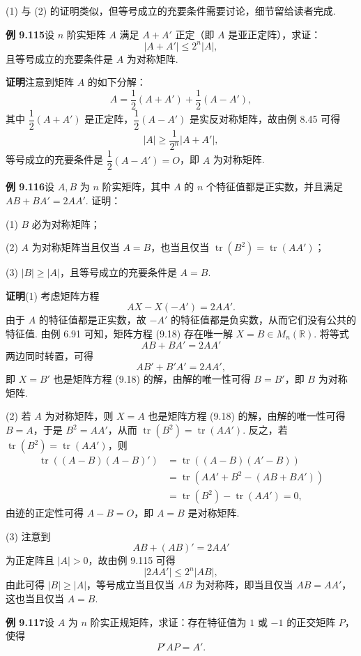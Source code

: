 \documentclass[UTF8,12pt,a4paper,fontset=fandol]{ctexart}
\begin{document}
(1) 与 (2) 的证明类似，但等号成立的充要条件需要讨论，细节留给读者完成.

\noindent\textbf{例 9.115}\quad 设 $n$ 阶实矩阵 $A$ 满足 $A+A'$ 正定（即 $A$ 是亚正定阵），求证：
\[
|A+A'|\le2^n|A|,
\]
且等号成立的充要条件是 $A$ 为对称矩阵.

\noindent\textbf{证明}\quad 注意到矩阵 $A$ 的如下分解：
\[
A=\frac{1}{2}(A+A')+\frac{1}{2}(A-A'),
\]
其中 $\dfrac{1}{2}(A+A')$ 是正定阵，$\dfrac{1}{2}(A-A')$ 是实反对称矩阵，故由例 8.45 可得
\[
|A|\ge \frac{1}{2^n}|A+A'|,
\]
等号成立的充要条件是 $\dfrac{1}{2}(A-A')=O$，即 $A$ 为对称矩阵.

\noindent\textbf{例 9.116}\quad 设 $A,B$ 为 $n$ 阶实矩阵，其中 $A$ 的 $n$ 个特征值都是正实数，并且满足 $AB+BA'=2AA'$. 证明：

(1) $B$ 必为对称矩阵；

(2) $A$ 为对称矩阵当且仅当 $A=B$，也当且仅当 $\operatorname{tr}(B^2)=\operatorname{tr}(AA')$；

(3) $|B|\ge |A|$，且等号成立的充要条件是 $A=B$.

\noindent\textbf{证明}\quad (1) 考虑矩阵方程
\begin{equation}
AX-X(-A')=2AA'.
\tag{9.18}
\end{equation}
由于 $A$ 的特征值都是正实数，故 $-A'$ 的特征值都是负实数，从而它们没有公共的特征值. 由例 6.91 可知，矩阵方程 (9.18) 存在唯一解 $X=B\in M_n(\mathbb{R})$. 将等式
\[
AB+BA'=2AA'
\]
两边同时转置，可得
\[
AB'+B'A'=2AA',
\]
即 $X=B'$ 也是矩阵方程 (9.18) 的解，由解的唯一性可得 $B=B'$，即 $B$ 为对称矩阵.

(2) 若 $A$ 为对称矩阵，则 $X=A$ 也是矩阵方程 (9.18) 的解，由解的唯一性可得 $B=A$，于是 $B^2=AA'$，从而 $\operatorname{tr}(B^2)=\operatorname{tr}(AA')$. 反之，若 $\operatorname{tr}(B^2)=\operatorname{tr}(AA')$，则
\[
\begin{aligned}
\operatorname{tr}((A-B)(A-B)')&=\operatorname{tr}((A-B)(A'-B))\\
&=\operatorname{tr}(AA'+B^2-(AB+BA'))\\
&=\operatorname{tr}(B^2)-\operatorname{tr}(AA')=0,
\end{aligned}
\]
由迹的正定性可得 $A-B=O$，即 $A=B$ 是对称矩阵.

(3) 注意到
\[
AB+(AB)'=2AA'
\]
为正定阵且 $|A|>0$，故由例 9.115 可得
\[
|2AA'|\le2^n|AB|,
\]
由此可得 $|B|\ge |A|$，等号成立当且仅当 $AB$ 为对称阵，即当且仅当 $AB=AA'$，这也当且仅当 $A=B$.

\noindent\textbf{例 9.117}\quad 设 $A$ 为 $n$ 阶实正规矩阵，求证：存在特征值为 $1$ 或 $-1$ 的正交矩阵 $P$，使得
\[
P'AP=A'.
\]
\end{document}
